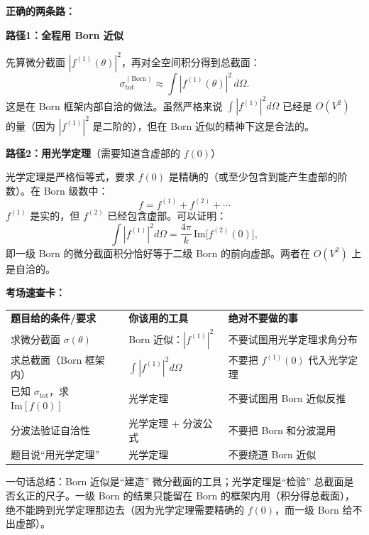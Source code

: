 \begin{derivationbox}
\textbf{正确的两条路：}

\textbf{路径1：全程用 Born 近似}

先算微分截面 $|f^{(1)}(\theta)|^2$，再对全空间积分得到总截面：
\[
\sigma_{\text{tot}}^{(\text{Born})} \approx \int |f^{(1)}(\theta)|^2 \, d\Omega.
\]
这是在 Born 框架内部自洽的做法。虽然严格来说 $\int |f^{(1)}|^2 d\Omega$ 已经是 $O(V^2)$ 的量（因为 $|f^{(1)}|^2$ 是二阶的），但在 Born 近似的精神下这是合法的。

\textbf{路径2：用光学定理}（需要知道含虚部的 $f(0)$）

光学定理是严格恒等式，要求 $f(0)$ 是精确的（或至少包含到能产生虚部的阶数）。在 Born 级数中：
\[
f = f^{(1)} + f^{(2)} + \cdots
\]
$f^{(1)}$ 是实的，但 $f^{(2)}$ 已经包含虚部。可以证明：
\[
\int |f^{(1)}|^2 d\Omega = \frac{4\pi}{k}\, \text{Im}\bigl[f^{(2)}(0)\bigr],
\]
即一级 Born 的微分截面积分恰好等于二级 Born 的前向虚部。两者在 $O(V^2)$ 上是自洽的。

\textbf{考场速查卡：}

\begin{tabular}{lll}
\textbf{题目给的条件/要求} & \textbf{你该用的工具} & \textbf{绝对不要做的事} \\
求微分截面 $\sigma(\theta)$ & Born 近似：$|f^{(1)}|^2$ & 不要试图用光学定理求角分布 \\
求总截面（Born 框架内） & $\int |f^{(1)}|^2 d\Omega$ & 不要把 $f^{(1)}(0)$ 代入光学定理 \\
已知 $\sigma_{\text{tot}}$，求 $\text{Im}[f(0)]$ & 光学定理 & 不要试图用 Born 近似反推 \\
分波法验证自洽性 & 光学定理 + 分波公式 & 不要把 Born 和分波混用 \\
题目说``用光学定理'' & 光学定理 & 不要绕道 Born 近似 \\
\end{tabular}

一句话总结：Born 近似是``建造'' 微分截面的工具；光学定理是``检验'' 总截面是否幺正的尺子。一级 Born 的结果只能留在 Born 的框架内用（积分得总截面），绝不能跨到光学定理那边去（因为光学定理需要精确的 $f(0)$，而一级 Born 给不出虚部）。
\end{derivationbox}

